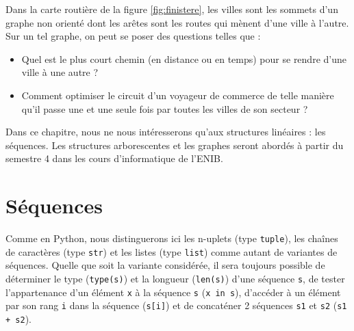 \begin{ex}\label{ex:finistere}
Dans la carte routière de la figure \ref{fig:finistere}, les villes sont les sommets
d'un graphe non orienté dont les arêtes sont les routes qui mènent d'une ville à l'autre.
Sur un tel graphe, on peut se poser des questions telles que :
\begin{itemize}
\item Quel est le plus court chemin (en distance ou
               en temps) pour se rendre d'une ville à une
               autre ?
\item Comment optimiser le circuit d'un voyageur de commerce de telle manière qu'il passe 
	une et une seule fois par toutes les villes de son secteur ?
\end{itemize}       
\end{ex}

Dans ce chapitre, nous ne nous intéresserons qu'aux structures linéaires : les séquences.
Les structures arborescentes et les graphes seront abordés à partir du semestre 4 dans 
les cours d'informatique
de l'ENIB.

\section{Séquences}\label{sequence}
Comme en {\sc Python}, nous distinguerons ici les n-uplets (type {\tt tuple}), les 
chaînes de caractères (type {\tt str}) et les listes (type {\tt list})
comme autant de variantes de séquences.
Quelle que soit la variante considérée, il sera toujours possible de 
déterminer le type ({\tt type(s)}) et la longueur ({\tt len(s)}) d'une séquence {\tt s}, 
de tester l'appartenance d'un élément {\tt x} à la séquence {\tt s} ({\tt x in s}), 
d'accéder à un élément par son rang {\tt i} dans la séquence ({\tt s[i]})
et de concaténer 2 séquences {\tt s1} et {\tt s2} ({\tt s1 + s2}).

